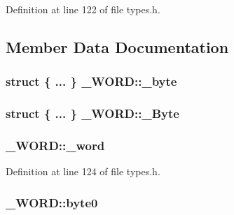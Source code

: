 Definition at line 122 of file types.\+h.



\subsection{Member Data Documentation}
\subsubsection[{\texorpdfstring{\+\_\+byte}{_byte}}]{\setlength{\rightskip}{0pt plus 5cm}struct \{ ... \}  \+\_\+\+W\+O\+R\+D\+::\+\_\+byte}\hypertarget{union___w_o_r_d_a8e49f349faf19cfa02763f3709cd5519}{}\label{union___w_o_r_d_a8e49f349faf19cfa02763f3709cd5519}
\subsubsection[{\texorpdfstring{\+\_\+\+Byte}{_Byte}}]{\setlength{\rightskip}{0pt plus 5cm}struct \{ ... \}  \+\_\+\+W\+O\+R\+D\+::\+\_\+\+Byte}\hypertarget{union___w_o_r_d_a025d229429d1dfdd660aed1a1d1a869b}{}\label{union___w_o_r_d_a025d229429d1dfdd660aed1a1d1a869b}
\subsubsection[{\texorpdfstring{\+\_\+word}{_word}}]{ \+\_\+\+W\+O\+R\+D\+::\+\_\+word}\hypertarget{union___w_o_r_d_abc73d592f7734d8cfde8bb9437dd7344}{}\label{union___w_o_r_d_abc73d592f7734d8cfde8bb9437dd7344}


Definition at line 124 of file types.\+h.

\subsubsection[{\texorpdfstring{byte0}{byte0}}]{ \+\_\+\+W\+O\+R\+D\+::byte0}\hypertarget{union___w_o_r_d_add842631704b01778ecbfebc4dc1a399}{}\label{union___w_o_r_d_add842631704b01778ecbfebc4dc1a399}


